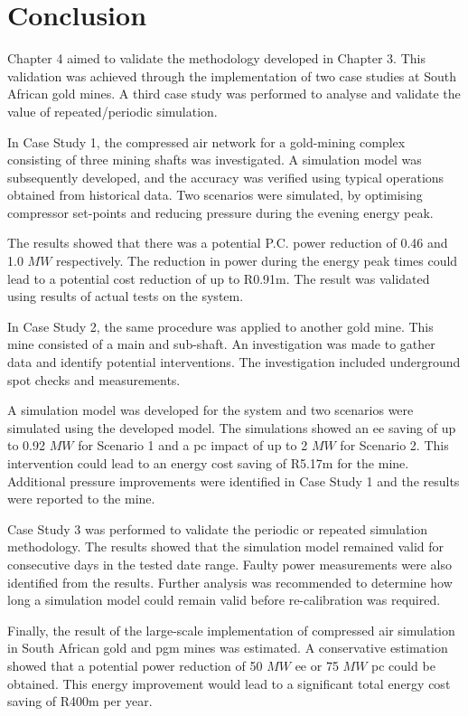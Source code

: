 \section{Conclusion}
Chapter 4 aimed to validate the methodology developed in Chapter 3. This validation was achieved through the implementation of two case studies at South African gold mines. A third case study was performed to analyse and validate the value of repeated/periodic simulation.
\par 
In Case Study 1, the compressed air network for a gold-mining complex consisting of three mining shafts was investigated. A simulation model was subsequently developed, and the accuracy was verified using typical operations obtained from historical data. Two scenarios were simulated, by optimising compressor set-points and reducing pressure during the evening energy peak.
\par 
The results showed that there was a potential P.C. power reduction of 0.46 and 1.0 $MW$ respectively. The reduction in power during the energy peak times could lead to a potential cost reduction of up to R0.91m. The result was validated using results of actual tests on the system.
\par
In Case Study 2, the same procedure was applied to another gold mine. This mine consisted of a main and sub-shaft. An investigation was made to gather data and identify potential interventions. The investigation included underground spot checks and measurements.
\par 
A simulation model was developed for the system and two scenarios were simulated using the developed model. The simulations showed an \gls{ee} saving of up to 0.92 $MW$ for Scenario 1 and a \gls{pc} impact of up to 2 $MW$ for Scenario 2. This intervention could lead to an energy cost saving of R5.17m for the mine. Additional pressure improvements were identified in Case Study 1 and the results were reported to the mine.
\par
\clearpage
Case Study 3 was performed to validate the periodic or repeated simulation methodology. The results showed that the simulation model remained valid for consecutive days in the tested date range. Faulty power measurements were also identified from the results. Further analysis was recommended to determine how long a simulation model could remain valid before re-calibration was required.
\par 
Finally, the result of the large-scale implementation of compressed air simulation in South African gold and \gls{pgm} mines was estimated. A conservative estimation showed that a potential power reduction of 50 $MW$ \gls{ee} or 75 $MW$ \gls{pc} could be obtained. This energy improvement would lead to a significant total energy cost saving of R400m per year.
